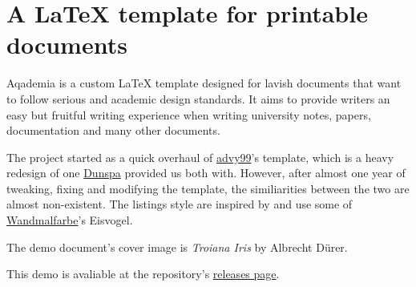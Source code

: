 \section{A \LaTeX{} template for printable documents}

Aqademia is a custom \LaTeX{} template designed for lavish documents that want to follow serious and academic design standards.
It aims to provide writers an easy but fruitful writing experience when writing university notes, papers, documentation and many other documents.

The project started as a quick overhaul of \href{https://github.com/advy99}{advy99}'s template, which is a heavy redesign of one \href{https://github.com/Dunspa}{Dunspa} provided us both with.
However, after almost one year of tweaking, fixing and modifying the template, the similiarities between the two are almost non-existent.
The listings style are inspired by and use some of \href{https://github.com/Wandmalfarbe}{Wandmalfarbe}'s Eisvogel.

The demo document's cover image is \textit{Troiana Iris} by Albrecht Dürer.

This demo is avaliable at the repository's \href{https://github.com/Groctel/aqademia/releases}{releases page}.
